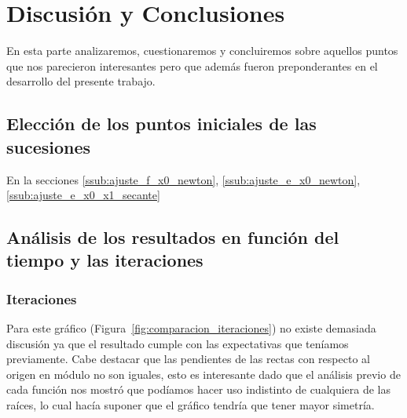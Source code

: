 \section{Discusión y Conclusiones}

En esta parte analizaremos, cuestionaremos y concluiremos sobre aquellos puntos que nos parecieron interesantes pero que además fueron preponderantes en el desarrollo del presente trabajo.

\subsection{Elección de los puntos iniciales de las sucesiones} %
\label{sub:elecci_n_de_los_puntos_iniciales_de_las_sucesiones}

En la secciones \ref{ssub:ajuste_f_x0_newton}, \ref{ssub:ajuste_e_x0_newton}, \ref{ssub:ajuste_e_x0_x1_secante}


\subsection{Análisis de los resultados en función del tiempo y las iteraciones} %
\label{sub:an_lisis_de_los_resultados_en_funci_n_del_tiempo_y_las_iteraciones}

\subsubsection{Iteraciones} %
\label{ssub:iteraciones}

Para este gráfico (Figura~\ref{fig:comparacion_iteraciones}) no existe demasiada discusión ya que el resultado cumple con las expectativas que teníamos previamente. Cabe destacar que las pendientes de las rectas con respecto al origen en módulo no son iguales, esto es interesante dado que el análisis previo de cada función nos mostró que podíamos hacer uso indistinto de cualquiera de las raíces, lo cual hacía suponer que el gráfico tendría que tener mayor simetría.\\

